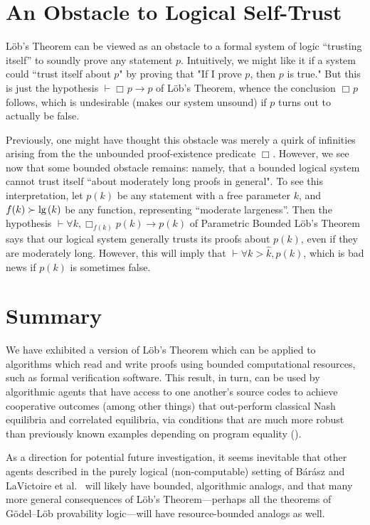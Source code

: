 \documentclass[onecolumn]{miri-tech-article}
\numberwithin{equation}{section}
\theoremstyle{definition}
\newcommand{\proves}[1]{\underset{#1}{\vdash}}
\newcommand{\bx}[1]{\Box_{#1}}
\renewcommand{\implies}{\rightarrow}
\renewcommand{\lg}{\mathrm{lg\hspace{0.3ex}}}
\renewcommand{\-}{^{-1}}
\begin{document}
\section{An Obstacle to Logical Self-Trust}
L\"{o}b's Theorem can be viewed as an obstacle to a formal system of logic ``trusting itself'' to soundly prove any statement $p$.  Intuitively, we might like it if a system could ``trust itself about $p$" by proving that "If I prove $p$, then $p$ is true."  But this is just the hypothesis $\proves{} \bx{}p \implies p$ of L\"{o}b's Theorem, whence the conclusion $\bx{}p$ follows, which is undesirable (makes our system unsound) if $p$ turns out to actually be false.

Previously, one might have thought this obstacle was merely a quirk of infinities arising from the the unbounded proof-existence predicate $\bx{}$.  However, we see now that some bounded obstacle remains: namely, that a bounded logical system cannot trust itself ``about moderately long proofs in general".  To see this interpretation, let $p(k)$ be any statement with a free parameter $k$, and $f(k) \succ \lg(k)$ be any function, representing ``moderate largeness''.  Then the hypothesis $\proves{} \forall k, \bx{f(k)} p(k) \implies p(k)$ of Parametric Bounded L\"{o}b's Theorem says that our logical system generally trusts its proofs about $p(k)$, even if they are moderately long.  However, this will imply that $\proves{} \forall k > \hat k, p(k)$, which is bad news if $p(k)$ is sometimes false.

\section{Summary}
We have exhibited a version of L\"{o}b's Theorem which can be applied to algorithms which read and write proofs using bounded computational resources, such as formal verification software.  This result, in turn, can be used by algorithmic agents that have access to one another's source codes to achieve cooperative outcomes (among other things) that out-perform classical Nash equilibria and correlated equilibria, via conditions that are much more robust than previously known examples depending on program equality (\cite{Tennenholtz:2004:Program}).

As a direction for potential future investigation, it seems inevitable that other agents described in the purely logical (non-computable) setting of  B\'{a}r\'{a}sz and LaVictoire et al.~\cite{Barasz:2014:RobustCooperation}\cite{LaVictoire:2014:PrisDilemmaLob} will likely have bounded, algorithmic analogs, and that many more general consequences of L\"{o}b's Theorem---perhaps all the theorems of G\"{o}del--L\"{o}b provability logic---will have resource-bounded analogs as well.
\end{document}
